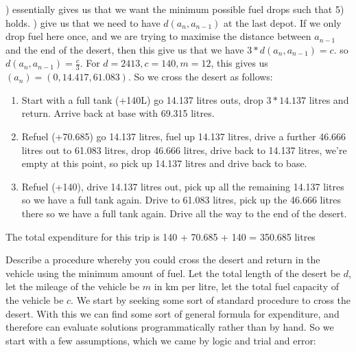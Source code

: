 \documentclass{homework}
\begin{document}
\newline{}) essentially gives us that we want the minimum possible fuel drops such that 5) holds.
\newline{}) give us that we need to have $d(a_n, a_{n-1})$ at the last depot. If we only drop fuel here once, and we are trying to maximise the distance between $a_{n-1}$ and the end of the desert, then this give us that we have $3*d(a_n, a_{n-1}) = c$. so $d(a_n, a_{n-1}) = \frac{c}{3}$. 
\newline\newline
For $d = 2413, c = 140, m = 12$, this gives us $(a_n) = (0, 14.417, 61.083)$. 
\newline\newline
So we cross the desert as follows:
\newline
\begin{enumerate}
    \item Start with a full tank (+140L) go 14.137 litres outs, drop $3*14.137$ litres and return. Arrive back at base with 69.315 litres.
    \item Refuel (+70.685) go 14.137 litres, fuel up 14.137 litres, drive a further 46.666 litres out to 61.083 litres, drop 46.666 litres, drive back to 14.137 litres, we're empty at this point, so pick up 14.137 litres and drive back to base.
    \item Refuel (+140), drive 14.137 litres out, pick up all the remaining 14.137 litres so we have a full tank again. Drive to 61.083 litres, pick up the 46.666 litres there so we have a full tank again. Drive all the way to the end of the desert.
\end{enumerate}
The total expenditure for this trip is 140 + 70.685 + 140 = 350.685 litres
\newpage

\question Describe a procedure whereby you could cross the desert and return in the vehicle using the minimum amount of fuel.
\newline\newline
Let the total length of the desert be $d$, let the mileage of the vehicle be $m$ in km per litre, let the total fuel capacity of the vehicle be $c$.
\newline\newline
We start by seeking some sort of standard procedure to cross the desert. With this we can find some sort of general formula for expenditure, and therefore can evaluate solutions programmatically rather than by hand. So we start with a few assumptions, which we came by logic and trial and error:
\end{document}
